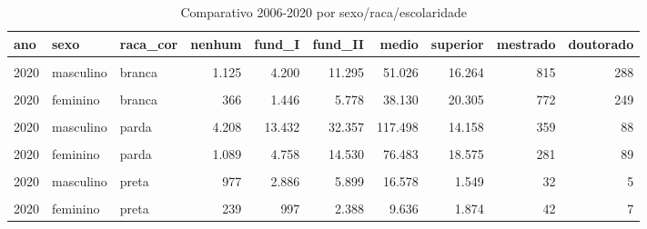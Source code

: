 \documentclass[
  12pt,
  letterpaper,
  DIV=11,
  numbers=noendperiod]{scrartcl}
\begin{document}
\begin{table}
\caption{Comparativo 2006-2020 por sexo/raca/escolaridade}\tabularnewline

\centering
\begin{tabular}[t]{l|l|l|r|r|r|r|r|r|r}
\hline
ano & sexo & raca\_cor & nenhum & fund\_I & fund\_II & medio & superior & mestrado & doutorado\\
\hline
\cellcolor{gray!6}{2006} & \cellcolor{gray!6}{masculino} & \cellcolor{gray!6}{branca} & \cellcolor{gray!6}{4.026} & \cellcolor{gray!6}{18.456} & \cellcolor{gray!6}{39.256} & \cellcolor{gray!6}{57.824} & \cellcolor{gray!6}{12.621} & \cellcolor{gray!6}{209} & \cellcolor{gray!6}{55}\\
\hline
2020 & masculino & branca & 1.125 & 4.200 & 11.295 & 51.026 & 16.264 & 815 & 288\\
\hline
\cellcolor{gray!6}{2006} & \cellcolor{gray!6}{feminino} & \cellcolor{gray!6}{branca} & \cellcolor{gray!6}{837} & \cellcolor{gray!6}{4.639} & \cellcolor{gray!6}{15.353} & \cellcolor{gray!6}{43.270} & \cellcolor{gray!6}{12.926} & \cellcolor{gray!6}{229} & \cellcolor{gray!6}{40}\\
\hline
2020 & feminino & branca & 366 & 1.446 & 5.778 & 38.130 & 20.305 & 772 & 249\\
\hline
\cellcolor{gray!6}{2006} & \cellcolor{gray!6}{masculino} & \cellcolor{gray!6}{parda} & \cellcolor{gray!6}{6.551} & \cellcolor{gray!6}{29.552} & \cellcolor{gray!6}{52.966} & \cellcolor{gray!6}{53.094} & \cellcolor{gray!6}{5.848} & \cellcolor{gray!6}{78} & \cellcolor{gray!6}{9}\\
\hline
2020 & masculino & parda & 4.208 & 13.432 & 32.357 & 117.498 & 14.158 & 359 & 88\\
\hline
\cellcolor{gray!6}{2006} & \cellcolor{gray!6}{feminino} & \cellcolor{gray!6}{parda} & \cellcolor{gray!6}{1.111} & \cellcolor{gray!6}{8.322} & \cellcolor{gray!6}{17.427} & \cellcolor{gray!6}{35.452} & \cellcolor{gray!6}{5.387} & \cellcolor{gray!6}{84} & \cellcolor{gray!6}{10}\\
\hline
2020 & feminino & parda & 1.089 & 4.758 & 14.530 & 76.483 & 18.575 & 281 & 89\\
\hline
\cellcolor{gray!6}{2006} & \cellcolor{gray!6}{masculino} & \cellcolor{gray!6}{preta} & \cellcolor{gray!6}{1.831} & \cellcolor{gray!6}{6.341} & \cellcolor{gray!6}{8.723} & \cellcolor{gray!6}{7.288} & \cellcolor{gray!6}{324} & \cellcolor{gray!6}{14} & \cellcolor{gray!6}{2}\\
\hline
2020 & masculino & preta & 977 & 2.886 & 5.899 & 16.578 & 1.549 & 32 & 5\\
\hline
\cellcolor{gray!6}{2006} & \cellcolor{gray!6}{feminino} & \cellcolor{gray!6}{preta} & \cellcolor{gray!6}{265} & \cellcolor{gray!6}{1.241} & \cellcolor{gray!6}{2.347} & \cellcolor{gray!6}{4.030} & \cellcolor{gray!6}{333} & \cellcolor{gray!6}{14} & \cellcolor{gray!6}{0}\\
\hline
2020 & feminino & preta & 239 & 997 & 2.388 & 9.636 & 1.874 & 42 & 7\\
\hline
\end{tabular}
\end{table}
\end{document}
